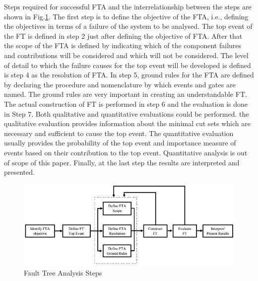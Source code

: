 \documentclass[10pt]{llncs}
\begin{document}
Steps required for successful FTA and the interrelationship between the steps are shown in Fig.\ref{fig4}\cite{Vesely2002}. The first step is to define the objective of the FTA, i.e., defining the objectives in terms of a failure of the system to be analysed. The top event of the FT is defined in step 2 just after defining the objective of FTA. After that the scope of the FTA is defined by indicating which of the component failures and contributions will be considered and which will not be considered. The level of detail to which the failure causes for the top event will be developed is defined is step 4 as the resolution of FTA. In step 5, ground rules for the FTA are defined by declaring the procedure and nomenclature by which events and gates are named. The ground rules are very important in creating an understandable FT. The actual construction of FT is performed in step 6 and the evaluation is done in Step 7. Both qualitative and quantitative evaluations could be performed. the qualitative evaluation provides information about the minimal cut sets which are necessary and sufficient to cause the top event. The quantitative evaluation usually provides the probability of the top event and importance measure of events based on their contribution to the top event. Quantitative analysis is out of scope of this paper. Finally, at the last step the results are interpreted and presented.   
	
	\begin{figure}[thpb]
      \centering
     
			\includegraphics[scale=0.5]{block_diagram1}%
 	  
      \caption{Fault Tree Analysis Steps}
      \label{fig4}
   \end{figure}	
\end{document}
